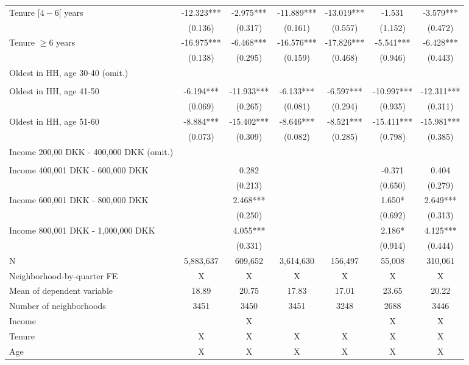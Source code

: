 \begin{tabular}{lcccccc}
Tenure $[4-6[$ years & -12.323*** & -2.975*** & -11.889*** & -13.019*** & -1.531 & -3.579*** \\ 
 & (0.136) & (0.317) & (0.161) & (0.557) & (1.152) & (0.472) \\ 
Tenure $\geq 6$ years & -16.975*** & -6.468*** & -16.576*** & -17.826*** & -5.541*** & -6.428*** \\ 
 & (0.138) & (0.295) & (0.159) & (0.468) & (0.946) & (0.443) \\ 
Oldest in HH, age 30-40 (omit.) &  &  &  &  &  &  \\ 
&  &  &  &  &  &  \\ 
Oldest in HH, age 41-50 & -6.194*** & -11.933*** & -6.133*** & -6.597*** & -10.997*** & -12.311*** \\ 
 & (0.069) & (0.265) & (0.081) & (0.294) & (0.935) & (0.311) \\ 
Oldest in HH, age 51-60 & -8.884*** & -15.402*** & -8.646*** & -8.521*** & -15.411*** & -15.981*** \\ 
 & (0.073) & (0.309) & (0.082) & (0.285) & (0.798) & (0.385) \\ 
 Income 200,00 DKK - 400,000 DKK (omit.) &  & &  &  &  &  \\ 
 &  &  &  &  &  &  \\ 
 Income 400,001 DKK - 600,000 DKK &  & 0.282 &  &  & -0.371 & 0.404 \\ 
 &  & (0.213) &  &  & (0.650) & (0.279) \\ 
Income 600,001 DKK - 800,000 DKK &  & 2.468*** &  &  & 1.650* & 2.649*** \\ 
 &  & (0.250) &  &  & (0.692) & (0.313) \\ 
Income 800,001 DKK - 1,000,000 DKK &  & 4.055*** &  &  & 2.186* & 4.125*** \\ 
 &  & (0.331) &  &  & (0.914) & (0.444) \\ 
 \midrule
N & 5,883,637 & 609,652 & 3,614,630 & 156,497 & 55,008 & 310,061 \\ 
Neighborhood-by-quarter FE & X & X & X & X & X & X \\ 
Mean of dependent variable & 18.89 & 20.75 & 17.83 & 17.01 & 23.65 & 20.22 \\ 
Number of neighborhoods & 3451 & 3450 & 3451 & 3248 & 2688 & 3446 \\ 
Income &  & X &  &  & X & X \\ 
Tenure & X & X & X & X & X & X \\ 
Age & X & X & X & X & X & X \\ 
\bottomrule
\end{tabular}